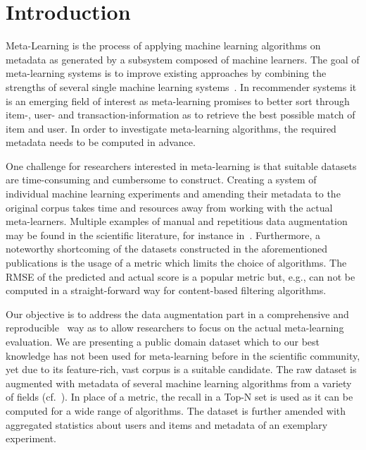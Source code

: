 \documentclass{IEEEtran}
\begin{document}
\section{Introduction}
Meta-Learning is the process of applying machine learning algorithms on metadata as generated by a subsystem composed of machine learners. The goal of meta-learning systems is to improve existing approaches by combining the strengths of several single machine learning systems~\cite{AIR:MetalearningSurveyOfTrendsAndTechnologiesLemke2015}. In recommender systems it is an emerging field of interest as meta-learning promises to better sort through item-, user- and transaction-information as to retrieve the best possible match of item and user. In order to investigate meta-learning algorithms, the required metadata needs to be computed in advance.

One challenge for researchers interested in meta-learning is that suitable datasets are time-consuming and cumbersome to construct. Creating a system of individual machine learning experiments and amending their metadata to the original corpus takes time and resources away from working with the actual meta-learners. Multiple examples of manual and repetitious data augmentation may be found in the scientific literature, for instance in~\cite{CUNHA2018128,DBLP:journals/corr/abs-1805-12118,Ekstrand:2012:RFP:2365952.2366002}. Furthermore, a noteworthy shortcoming of the datasets constructed in the aforementioned publications is the usage of a metric which limits the choice of algorithms. The RMSE of the predicted and actual score is a popular metric but, e.g., can not be computed in a straight-forward way for content-based filtering algorithms.

Our objective is to address the data augmentation part in a comprehensive and reproducible~\cite{UMUAI:TowardsReproducibilityInRecSysBeel2016} way as to allow researchers to focus on the actual meta-learning evaluation. We are presenting a public domain dataset which to our best knowledge has not been used for meta-learning before in the scientific community, yet due to its feature-rich, vast corpus is a suitable candidate. The raw dataset is augmented with metadata of several machine learning algorithms from a variety of fields (cf.~\cite{DBLP:journals/corr/abs-1805-12118}). In place of a metric, the recall in a Top-N set is used as it can be computed for a wide range of algorithms. The dataset is further amended with aggregated statistics about users and items and metadata of an exemplary experiment.
\end{document}
